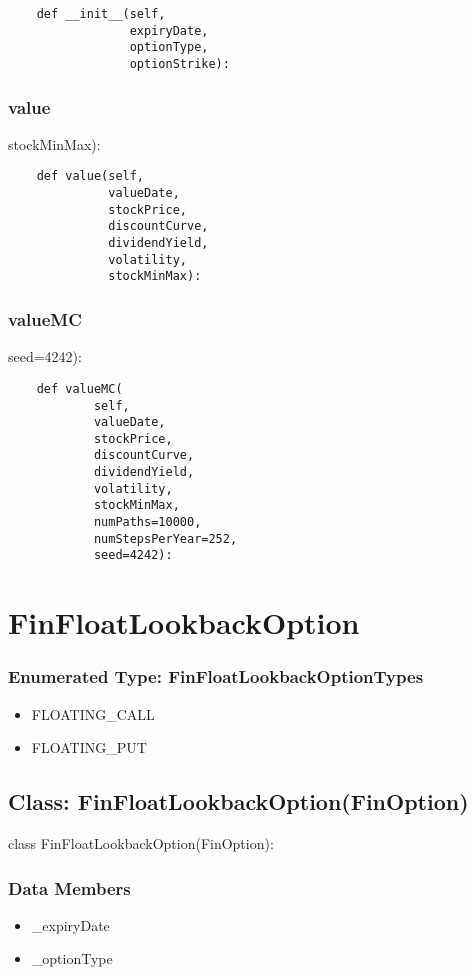 \documentclass[twoside,11pt]{book}
\begin{document}
\begin{lstlisting}
    def __init__(self,
                 expiryDate,
                 optionType,
                 optionStrike):
\end{lstlisting}

\subsubsection*{{\bf value}}
stockMinMax): 

\begin{lstlisting}
    def value(self,
              valueDate,
              stockPrice,
              discountCurve,
              dividendYield,
              volatility,
              stockMinMax):
\end{lstlisting}

\subsubsection*{{\bf valueMC}}
seed=4242): 

\begin{lstlisting}
    def valueMC(
            self,
            valueDate,
            stockPrice,
            discountCurve,
            dividendYield,
            volatility,
            stockMinMax,
            numPaths=10000,
            numStepsPerYear=252,
            seed=4242):
\end{lstlisting}

\newpage
\section{FinFloatLookbackOption}

\subsubsection{Enumerated Type: FinFloatLookbackOptionTypes}
\begin{itemize}
\item{FLOATING\_CALL}
\item{FLOATING\_PUT}
\end{itemize}

\subsection*{Class: FinFloatLookbackOption(FinOption)}
class FinFloatLookbackOption(FinOption): 

\subsubsection*{Data Members}
\begin{itemize}
\item{\_expiryDate}
\item{\_optionType}
\end{itemize}
\end{document}
